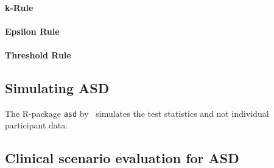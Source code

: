 \documentclass[bimj,fleqn]{w-art}
\theoremstyle{plain}
\theoremstyle{definition}
\begin{document}
\paragraph{k-Rule} %

\paragraph{Epsilon Rule}

\paragraph{Threshold Rule}

\subsection{Simulating ASD}
\label{ssec:simulating_asd}
The R-package \texttt{asd} by~\citet{parsons_software_2011} simulates the test statistics and not individual participant data.

\subsection{Clinical scenario evaluation for ASD}
\label{ssec:clinical_scenario_evaluation_for_asd}
\end{document}

